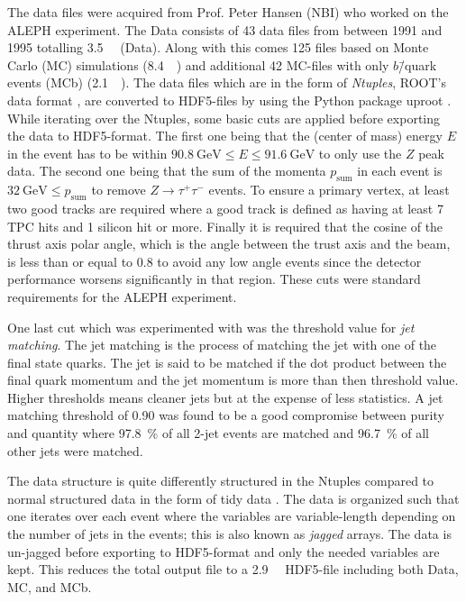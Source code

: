 The data files were acquired from Prof. Peter Hansen (NBI) who worked on the ALEPH experiment. The Data consists of \num{43} data files from between \num{1991} and \num{1995} totalling \SI{3.5}{\giga\byte} (Data). Along with this comes \num{125} files based on Monte Carlo (MC) simulations (\SI{8.4}{\giga\byte}) and additional \num{42} MC-files with only $b$\=/quark events (MCb) (\SI{2.1}{\giga\byte}). The data files which are in the form of \emph{Ntuples}, ROOT's data format \autocite{brunROOTObjectOriented1997}, are converted to HDF5-files by using the Python package uproot \autocite{ScikithepUproot2019}. While iterating over the Ntuples, some basic cuts are applied before exporting the data to HDF5-format. The first one being that the (center of mass) energy $E$ in the event has to be within $\SI{90.8}{\GeV} \leq E \leq \SI{91.6}{\GeV}$ to only use the $Z$ peak data. The second one being that the sum of the momenta $p_\mathrm{sum}$ in each event is $\SI{32}{\GeV} \leq p_\mathrm{sum}$ to remove $Z \rightarrow \tau^+ \tau^-$ events. To ensure a primary vertex, at least two good tracks are required where a good track is defined as having at least \num{7} TPC hits and 1 silicon hit or more. Finally it is required that the cosine of the thrust axis polar angle, which is the angle between the trust axis and the beam, is less than or equal to \num{0.8} to avoid any low angle events since the detector performance worsens significantly in that region. These cuts were standard requirements for the ALEPH experiment.

One last cut which was experimented with was the threshold value for \emph{jet matching}. The jet matching is the process of matching the jet with one of the final state quarks. The jet is said to be matched if the dot product between the final quark momentum and the jet momentum is more than then threshold value. Higher thresholds means cleaner jets but at the expense of less statistics. A jet matching threshold of \num{0.90} was found to be a good compromise between purity and quantity where \SI{97.8}{\percent} of all 2-jet events are matched and \SI{96.7}{\percent} of all other jets were matched.  

The data structure is quite differently structured in the Ntuples compared to normal structured data in the form of tidy data \autocite{JSSv059i10}. The data is organized such that one iterates over each event where the variables are variable-length depending on the number of jets in the events; this is also known as \emph{jagged} arrays. The data is un-jagged before exporting to HDF5-format and only the needed variables are kept. This reduces the total output file to a \SI{2.9}{\giga\byte} HDF5-file including both Data, MC, and MCb.

